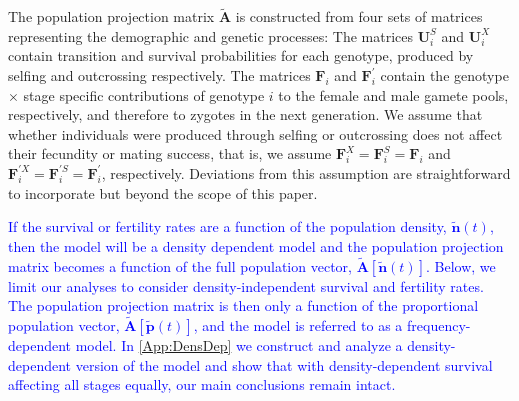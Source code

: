 \documentclass[11pt]{article}
\def\mbf#1{\mathbf{#1}}
\begin{document}
The population projection matrix $\tilde{\mbf{A}}$ is constructed from four sets of matrices representing the demographic and genetic processes: The matrices $\mbf{U}^{S}_{i}$ and $\mbf{U}^{X}_{i}$ contain transition and survival probabilities for each genotype, produced by selfing and outcrossing respectively. The matrices $\mbf{F}_{i}$ and $\mbf{F}^{\prime}_{i}$ contain the genotype $\times$ stage specific contributions of genotype $i$ to the female and male gamete pools, respectively, and therefore to zygotes in the next generation. We assume that whether individuals were produced through selfing or outcrossing does not affect their fecundity or mating success, that is, we assume  $\mbf{F}^X_{i}=\mbf{F}^S_{i}=\mbf{F}_{i}$ and $\mbf{F}^{\prime X}_{i}=\mbf{F}^{\prime S}_{i}=\mbf{F}^{\prime}_{i}$, respectively. Deviations from this assumption are straightforward to incorporate but beyond the scope of this paper. 

\textcolor{blue}{If the survival or fertility rates are a function of the population density, $\tilde{\mbf{n}}(t)$, then the model will be a density dependent model and the population projection matrix becomes a function of the full population vector, $\tilde{\mbf{A}}[\tilde{\mbf{n}}(t)]$. Below, we limit our analyses to consider density-independent survival and fertility rates. The population projection matrix is then only a function of the proportional population vector, $\tilde{\mbf{A}}[\tilde{\mbf{p}}(t)]$, and the model is referred to as a frequency-dependent model. In \ref{App:DensDep} we construct and analyze a density-dependent version of the model and show that with density-dependent survival affecting all stages equally, our main conclusions remain intact.}
\end{document}
